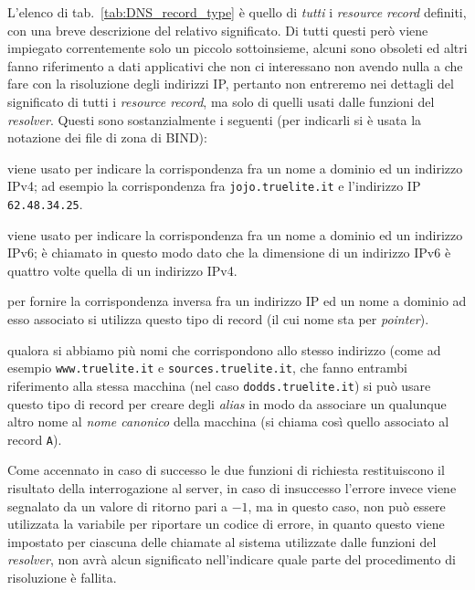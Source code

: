 L'elenco di tab.~\ref{tab:DNS_record_type} è quello di \textsl{tutti} i
\textit{resource record} definiti, con una breve descrizione del relativo
significato.  Di tutti questi però viene impiegato correntemente solo un
piccolo sottoinsieme, alcuni sono obsoleti ed altri fanno riferimento a dati
applicativi che non ci interessano non avendo nulla a che fare con la
risoluzione degli indirizzi IP, pertanto non entreremo nei dettagli del
significato di tutti i \textit{resource record}, ma solo di quelli usati dalle
funzioni del \textit{resolver}. Questi sono sostanzialmente i seguenti (per
indicarli si è usata la notazione dei file di zona di BIND):
\begin{basedescript}{\desclabelwidth{1.2cm}\desclabelstyle{\nextlinelabel}}
\item[\texttt{A}] viene usato per indicare la corrispondenza fra un nome a
  dominio ed un indirizzo IPv4; ad esempio la corrispondenza fra
  \texttt{jojo.truelite.it} e l'indirizzo IP \texttt{62.48.34.25}.
\item[\texttt{AAAA}] viene usato per indicare la corrispondenza fra un nome a
  dominio ed un indirizzo IPv6; è chiamato in questo modo dato che la
  dimensione di un indirizzo IPv6 è quattro volte quella di un indirizzo IPv4.
\item[\texttt{PTR}] per fornire la corrispondenza inversa fra un indirizzo IP
  ed un nome a dominio ad esso associato si utilizza questo tipo di record (il
  cui nome sta per \textit{pointer}).
\item[\texttt{CNAME}] qualora si abbiamo più nomi che corrispondono allo
  stesso indirizzo (come ad esempio \texttt{www.truelite.it} e
  \texttt{sources.truelite.it}, che fanno entrambi riferimento alla stessa
  macchina (nel caso \texttt{dodds.truelite.it}) si può usare questo tipo di
  record per creare degli \textit{alias} in modo da associare un qualunque
  altro nome al \textsl{nome canonico} della macchina (si chiama così quello
  associato al record \texttt{A}).
\end{basedescript}

Come accennato in caso di successo le due funzioni di richiesta restituiscono
il risultato della interrogazione al server, in caso di insuccesso l'errore
invece viene segnalato da un valore di ritorno pari a $-1$, ma in questo caso,
non può essere utilizzata la variabile  per riportare un codice di
errore, in quanto questo viene impostato per ciascuna delle chiamate al
sistema utilizzate dalle funzioni del \textit{resolver}, non avrà alcun
significato nell'indicare quale parte del procedimento di risoluzione è
fallita.

